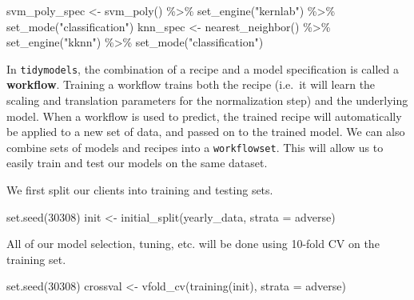 \documentclass[
]{article}
\newenvironment{Shaded}{\begin{snugshade}}{\end{snugshade}}
\newcommand{\AttributeTok}[1]{\textcolor[rgb]{0.77,0.63,0.00}{#1}}
\newcommand{\DecValTok}[1]{\textcolor[rgb]{0.00,0.00,0.81}{#1}}
\newcommand{\FunctionTok}[1]{\textcolor[rgb]{0.00,0.00,0.00}{#1}}
\newcommand{\NormalTok}[1]{#1}
\newcommand{\OtherTok}[1]{\textcolor[rgb]{0.56,0.35,0.01}{#1}}
\newcommand{\SpecialCharTok}[1]{\textcolor[rgb]{0.00,0.00,0.00}{#1}}
\newcommand{\StringTok}[1]{\textcolor[rgb]{0.31,0.60,0.02}{#1}}
\begin{document}
\begin{Shaded}
\begin{Highlighting}[]
\NormalTok{svm\_poly\_spec }\OtherTok{\textless{}{-}}
  \FunctionTok{svm\_poly}\NormalTok{() }\SpecialCharTok{\%\textgreater{}\%}
  \FunctionTok{set\_engine}\NormalTok{(}\StringTok{"kernlab"}\NormalTok{) }\SpecialCharTok{\%\textgreater{}\%}
  \FunctionTok{set\_mode}\NormalTok{(}\StringTok{"classification"}\NormalTok{)}
\NormalTok{knn\_spec }\OtherTok{\textless{}{-}}
  \FunctionTok{nearest\_neighbor}\NormalTok{() }\SpecialCharTok{\%\textgreater{}\%}
  \FunctionTok{set\_engine}\NormalTok{(}\StringTok{"kknn"}\NormalTok{) }\SpecialCharTok{\%\textgreater{}\%}
  \FunctionTok{set\_mode}\NormalTok{(}\StringTok{"classification"}\NormalTok{)}
\end{Highlighting}
\end{Shaded}

In \texttt{tidymodels}, the combination of a recipe and a model
specification is called a \textbf{workflow}. Training a workflow trains
both the recipe (i.e.~it will learn the scaling and translation
parameters for the normalization step) and the underlying model. When a
workflow is used to predict, the trained recipe will automatically be
applied to a new set of data, and passed on to the trained model. We can
also combine sets of models and recipes into a \texttt{workflowset}.
This will allow us to easily train and test our models on the same
dataset.

We first split our clients into training and testing sets.

\begin{Shaded}
\begin{Highlighting}[]
\FunctionTok{set.seed}\NormalTok{(}\DecValTok{30308}\NormalTok{)}
\NormalTok{init }\OtherTok{\textless{}{-}} \FunctionTok{initial\_split}\NormalTok{(yearly\_data, }\AttributeTok{strata =}\NormalTok{ adverse)}
\end{Highlighting}
\end{Shaded}

All of our model selection, tuning, etc. will be done using 10-fold CV
on the training set.

\begin{Shaded}
\begin{Highlighting}[]
\FunctionTok{set.seed}\NormalTok{(}\DecValTok{30308}\NormalTok{)}
\NormalTok{crossval }\OtherTok{\textless{}{-}} \FunctionTok{vfold\_cv}\NormalTok{(}\FunctionTok{training}\NormalTok{(init), }\AttributeTok{strata =}\NormalTok{ adverse)}
\end{Highlighting}
\end{Shaded}
\end{document}
